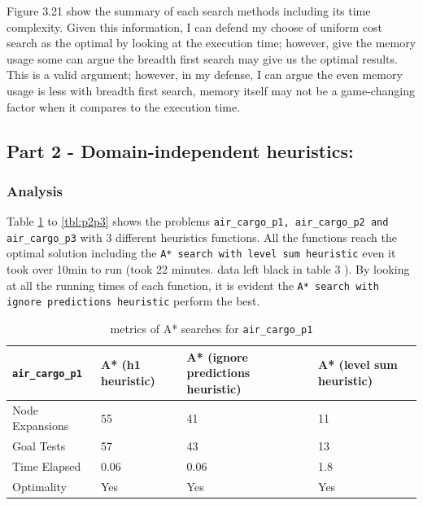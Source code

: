 \documentclass{article}
\begin{document}
Figure 3.21 show the summary of each search methods including its time complexity. Given this information, I can defend my choose of uniform cost search as the optimal by looking at the execution time; however, give the memory usage some can argue the breadth first search may give us the optimal results. This is a valid argument; however, in my defense, I can argue the even memory usage is less with breadth first search, memory itself may not be a game-changing factor when it compares to the execution time. 



\subsection*{Part 2 - Domain-independent heuristics:}

\subsubsection*{Analysis}
Table \ref{tbl:p2p1}  to  \ref{tbl:p2p3} shows the problems {\tt air\_cargo\_p1, air\_cargo\_p2 and air\_cargo\_p3} with 3 different heuristics functions. All the functions reach the optimal solution including the {\tt A* search with level sum heuristic} even it took over 10min to run (took 22 minutes. data left black in table 3 ).  By looking at all the running times of each function, it is evident the {\tt  A* search with ignore predictions heuristic} perform the best.


\begin{table}[h]
\begin{center}
\begin{tabular}{|l|l|l|l|}
\hline
{\tt air\_cargo\_p1} & A* (h1 heuristic) & A* (ignore predictions heuristic) & A* (level sum heuristic)\\ \hline\hline
Node Expansions& 55  &  41 & 11 \\ 
Goal Tests & 57 & 43  & 13 \\ 
Time Elapsed& 0.06 & 0.06  & 1.8 \\ 
Optimality & Yes & Yes & Yes \\ \hline
\end{tabular}
\end{center}
\caption{metrics of A* searches for {\tt air\_cargo\_p1}}
\label{tbl:p2p1}
\end{table}
\end{document}

